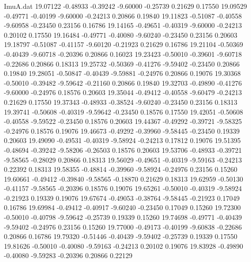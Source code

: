 \begin{filecontents}{ImuA.dat}
  19.07122   -0.48933   -0.39242   -9.60000   -0.25739    0.21629    0.17550
  19.09529   -0.49771   -0.40199   -9.60000   -0.24213    0.20866    0.19840
  19.11823   -0.51087   -0.40558   -9.60958   -0.23450    0.23156    0.16786
  19.14165   -0.49651   -0.40319   -9.60000   -0.24213    0.20102    0.17550
  19.16484   -0.49771   -0.40080   -9.60240   -0.23450    0.23156    0.20603
  19.18797   -0.51087   -0.41157   -9.60120   -0.21923    0.21629    0.16786
  19.21104   -0.50369   -0.40439   -9.60718   -0.20396    0.20866    0.16023
  19.23423   -0.50010   -0.39601   -9.60718   -0.22686    0.20866    0.18313
  19.25732   -0.50369   -0.41276   -9.59402   -0.23450    0.20866    0.19840
  19.28051   -0.50847   -0.40439   -9.59881   -0.24976    0.20866    0.19076
  19.30368   -0.50010   -0.39482   -9.59642   -0.21160    0.20866    0.19840
  19.32703   -0.49890   -0.41276   -9.60000   -0.24976    0.18576    0.20603
  19.35044   -0.49412   -0.40558   -9.60479   -0.24213    0.21629    0.17550
  19.37343   -0.48933   -0.38524   -9.60240   -0.23450    0.23156    0.18313
  19.39741   -0.50608   -0.40319   -9.59642   -0.23450    0.18576    0.17550
  19.42051   -0.50608   -0.40558   -9.59522   -0.23450    0.18576    0.20603
  19.44367   -0.49292   -0.39721   -9.58325   -0.24976    0.18576    0.19076
  19.46673   -0.49292   -0.39960   -9.58445   -0.23450    0.19339    0.20603
  19.49090   -0.49531   -0.40319   -9.58924   -0.24213    0.17812    0.19076
  19.51395   -0.48694   -0.39242   -9.58206   -0.26503    0.18576    0.20603
  19.53706   -0.48933   -0.39721   -9.58565   -0.28029    0.20866    0.18313
  19.56029   -0.49651   -0.40319   -9.59163   -0.24213    0.22392    0.18313
  19.58355   -0.48814   -0.39960   -9.58924   -0.24976    0.23156    0.15260
  19.60661   -0.49412   -0.39840   -9.58565   -0.18870    0.21629    0.18313
  19.62959   -0.50130   -0.41157   -9.58565   -0.20396    0.18576    0.19076
  19.65261   -0.50010   -0.40319   -9.58924   -0.21923    0.19339    0.19076
  19.67674   -0.49053   -0.38764   -9.58445   -0.21923    0.17049    0.16786
  19.69984   -0.49412   -0.40917   -9.60240   -0.23450    0.17049    0.15260
  19.72300   -0.50010   -0.40798   -9.59642   -0.25739    0.19339    0.15260
  19.74698   -0.49771   -0.40439   -9.59402   -0.24976    0.23156    0.15260
  19.77000   -0.49173   -0.40199   -9.60838   -0.22686    0.20866    0.16786
  19.79320   -0.51446   -0.40439   -9.59402   -0.25739    0.19339    0.17550
  19.81626   -0.50010   -0.40080   -9.59163   -0.24213    0.20102    0.19076
  19.83928   -0.49890   -0.40080   -9.59283   -0.20396    0.20866    0.22129

\end{filecontents}
